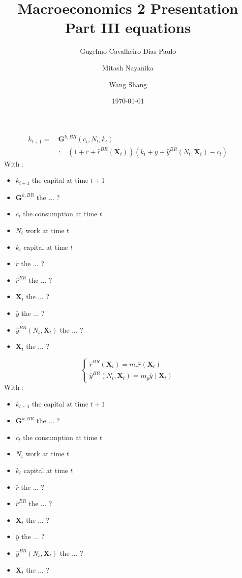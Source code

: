\documentclass{article}
\title{Macroeconomics 2 Presentation \\ Part III equations}
\author{Gugelmo Cavalheiro Dias Paulo \\ \and Mitash Nayanika \\ \and Wang Shang}
\date{\today}
\begin{document}
\maketitle

\begin{equation} \tag{49}
    \begin{split}
        k_{t+1}= &\  \textbf{G}^{k,BR}(c_{t},N_{t},k_{t}) \\
        & := (1+\bar{r}+\hat{r}^{BR}(\textbf{X}_t))(k_{t}+\bar{y}+\hat{y}^{BR}(N_{t},\textbf{X}_t)-c_{t})
    \end{split}
\end{equation}
With : 
\begin{itemize}
    \item $k_{t+1}$ the capital at time $t+1$
    \item $\textbf{G}^{k,BR}$ the ... ?
    \item $c_t$ the consumption at time $t$
    \item $N_{t}$ work at time $t$
    \item $k_t$ capital at time $t$
    \item $\bar{r}$ the ... ?
    \item $\hat{r}^{BR}$ the ... ?
    \item $\textbf{X}_t$ the ... ?
    \item $\bar{y}$ the ... ?
    \item $\hat{y}^{BR}(N_t,\textbf{X}_{t})$ the ... ?
    \item $\textbf{X}_{t}$ the ... ?  
\end{itemize}

\begin{equation} \tag{49}
    \begin{cases}
        \hat{r}^{BR}(\textbf{X}_{t})=m_{r}\hat{r}(\textbf{X}_t) \\
        \hat{y}^{BR}(N_{t},\textbf{X}_{t})=m_y\hat{y}(\textbf{X}_{t})
    \end{cases}
\end{equation}
With : 
\begin{itemize}
    \item $k_{t+1}$ the capital at time $t+1$
    \item $\textbf{G}^{k,BR}$ the ... ?
    \item $c_t$ the consumption at time $t$
    \item $N_{t}$ work at time $t$
    \item $k_t$ capital at time $t$
    \item $\bar{r}$ the ... ?
    \item $\hat{r}^{BR}$ the ... ?
    \item $\textbf{X}_t$ the ... ?
    \item $\bar{y}$ the ... ?
    \item $\hat{y}^{BR}(N_t,\textbf{X}_{t})$ the ... ?
    \item $\textbf{X}_{t}$ the ... ?  
\end{itemize}
\end{document}
